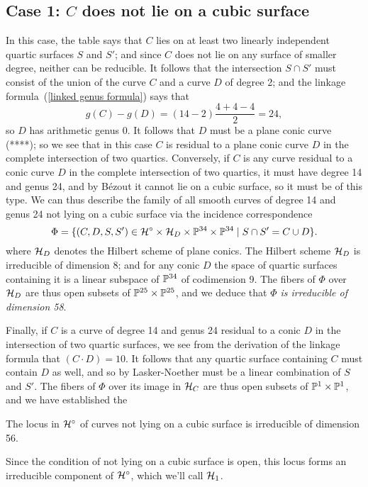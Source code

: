 \subsection{Case 1: $C$ does not lie on a cubic surface}

In this case, the table says that $C$ lies on at least two linearly independent quartic surfaces $S$ and $S'$; and since $C$ does not lie on any surface of smaller degree, neither can be reducible. It follows that the intersection $S \cap S'$ must consist of the union of the curve $C$ and a curve $D$ of degree 2; and the linkage formula~(\ref{linked genus formula}) says that
$$
g(C) - g(D) = (14 - 2)\frac{4+4-4}{2} = 24,
$$
so $D$ has arithmetic genus 0. It follows that $D$ must be a plane conic curve (****); so we see that in this case $C$ is residual to a plane conic curve $D$ in the complete intersection of two quartics. Conversely, if $C$ is any curve residual to a conic curve $D$ in the complete intersection of two quartics, it must have degree 14 and genus 24, and by B\'ezout it cannot lie on a cubic surface, so it must be of this type. We can thus describe the family of all smooth curves of degree 14 and genus 24 not lying on a cubic surface via the incidence correspondence
$$
\Phi = \{ (C, D, S, S') \in \cH^\circ \times \cH_D \times \PP^{34} \times \PP^{34} \mid S \cap S' = C \cup D\}.
$$
where $\cH_D$ denotes the Hilbert scheme of plane conics. The Hilbert scheme $\cH_D$ is irreducible of dimension 8; and for any conic $D$ the space of quartic surfaces containing it is a linear subspace of $\PP^{34}$ of codimension 9. The fibers of $\Phi$ over $\cH_D$ are thus open subsets of $\PP^{25} \times \PP^{25}$, and we deduce that \emph{$\Phi$ is irreducible of dimension 58}. 

Finally, if $C$ is a curve of degree 14 and genus 24 residual to a conic $D$ in the intersection of two quartic surfaces, we see from the derivation of the linkage formula that $(C\cdot D) = 10$. It follows that any quartic surface containing $C$ must contain $D$ as well, and so by Lasker-Noether must be a linear combination of $S$ and $S'$. The fibers of $\Phi$ over its image in $\cH_C$ are thus open subsets of $\PP^1 \times \PP^1$, and we have established the

\begin{proposition}
The locus in $\cH^\circ$ of curves not lying on a cubic surface is irreducible of dimension 56.
\end{proposition} 

Since the condition of not lying on a cubic surface is open, this locus forms an irreducible component of $\cH^\circ$, which we'll call $\cH_1$.

